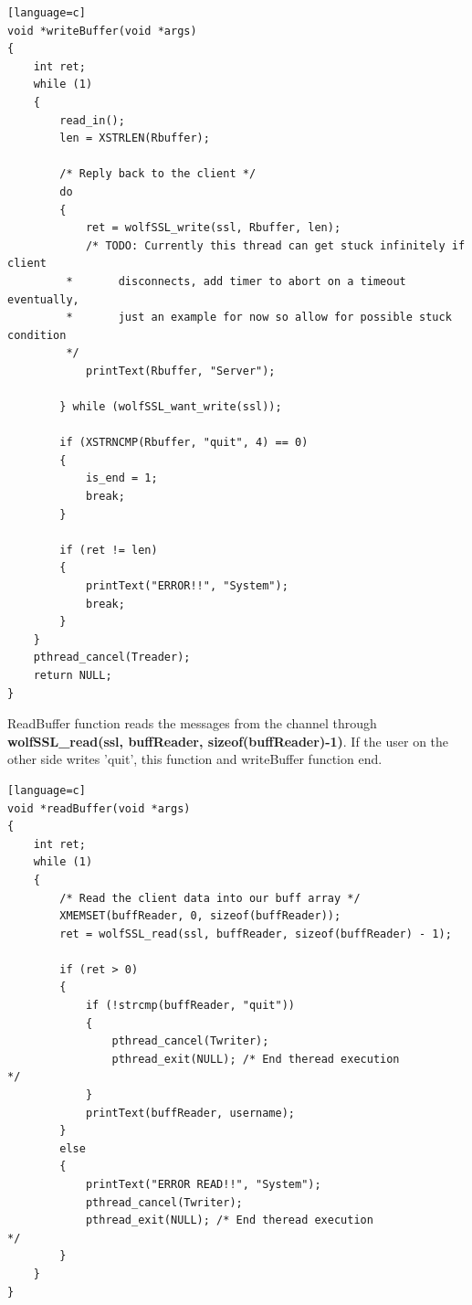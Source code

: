 \documentclass[a4paper,12pt]{report}
\begin{document}
\begin{lstlisting}[caption={writeBuffer() of SSL server},captionpos=b][language=c]
void *writeBuffer(void *args)
{
    int ret;
    while (1)
    {
        read_in();
        len = XSTRLEN(Rbuffer);

        /* Reply back to the client */
        do
        {
            ret = wolfSSL_write(ssl, Rbuffer, len);
            /* TODO: Currently this thread can get stuck infinitely if client
         *       disconnects, add timer to abort on a timeout eventually,
         *       just an example for now so allow for possible stuck condition
         */
            printText(Rbuffer, "Server");

        } while (wolfSSL_want_write(ssl));

        if (XSTRNCMP(Rbuffer, "quit", 4) == 0)
        {
            is_end = 1;
            break;
        }

        if (ret != len)
        {
            printText("ERROR!!", "System");
            break;
        }
    }
    pthread_cancel(Treader);
    return NULL;
}
\end{lstlisting}
ReadBuffer function reads the messages from the channel through \textbf{wolfSSL\_read(ssl, buffReader, sizeof(buffReader)-1)}. If the user on the other side writes 'quit', this function and writeBuffer function end.
\begin{lstlisting}[caption={readBuffer() of SSL server},captionpos=b][language=c]
void *readBuffer(void *args)
{
    int ret;
    while (1)
    {
        /* Read the client data into our buff array */
        XMEMSET(buffReader, 0, sizeof(buffReader));
        ret = wolfSSL_read(ssl, buffReader, sizeof(buffReader) - 1);

        if (ret > 0)
        {
            if (!strcmp(buffReader, "quit"))
            {
                pthread_cancel(Twriter);
                pthread_exit(NULL); /* End theread execution                */
            }
            printText(buffReader, username);
        }
        else
        {
            printText("ERROR READ!!", "System");
            pthread_cancel(Twriter);
            pthread_exit(NULL); /* End theread execution                */
        }
    }
}
\end{lstlisting}
\pagebreak
\end{document}
